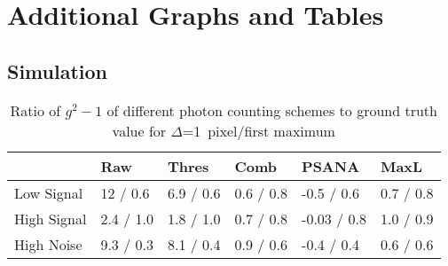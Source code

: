 \chapter{Additional Graphs and Tables}
\section{Simulation}
\begin{table}
	\caption{Ratio of $g^2-1$ of different photon counting schemes to ground truth value  for $\Delta$=1\, pixel/first maximum}
	\begin{tabular}{llllll}
		
		\toprule
		{} &           Raw &        Thres &         Comb &         PSANA &         MaxL \\
		\midrule
		Low Signal  &  12 / 0.6 &  6.9 / 0.6 &  0.6 / 0.8 &   -0.5 / 0.6 &  0.7 / 0.8 \\
		High Signal &    2.4 / 1.0 &  1.8 / 1.0 &  0.7 / 0.8 &  -0.03 / 0.8 &  1.0 / 0.9 \\
		High Noise  &    9.3 / 0.3 &  8.1 / 0.4 &  0.9 / 0.6 &  -0.4 / 0.4 &  0.6 / 0.6 \\
		\bottomrule
	\end{tabular}
\end{table}